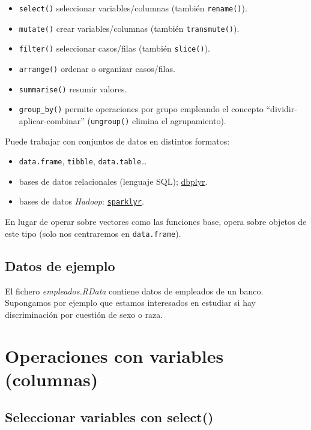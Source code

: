 \documentclass[
]{book}
\theoremstyle{break}
\theoremstyle{nonumberplain}
\begin{document}
\begin{itemize}
\item
  \texttt{select()} seleccionar variables/columnas (también \texttt{rename()}).
\item
  \texttt{mutate()} crear variables/columnas (también \texttt{transmute()}).
\item
  \texttt{filter()} seleccionar casos/filas (también \texttt{slice()}).
\item
  \texttt{arrange()} ordenar o organizar casos/filas.
\item
  \texttt{summarise()} resumir valores.
\item
  \texttt{group\_by()} permite operaciones por grupo empleando el concepto
  ``dividir-aplicar-combinar'' (\texttt{ungroup()} elimina el agrupamiento).
\end{itemize}

Puede trabajar con conjuntos de datos en distintos formatos:

\begin{itemize}
\item
  \texttt{data.frame}, \texttt{tibble}, \texttt{data.table}\ldots{}
\item
  bases de datos relacionales (lenguaje SQL); \href{https://dbplyr.tidyverse.org}{dbplyr}.
\item
  bases de datos \emph{Hadoop}: \href{https://spark.rstudio.com}{\texttt{sparklyr}}.
\end{itemize}

En lugar de operar sobre vectores como las funciones base,
opera sobre objetos de este tipo (solo nos centraremos en \texttt{data.frame}).

\hypertarget{datos-de-ejemplo-1}{%
\subsection{Datos de ejemplo}\label{datos-de-ejemplo-1}}

El fichero \emph{empleados.RData} contiene datos de empleados de un banco.
Supongamos por ejemplo que estamos interesados en estudiar si hay
discriminación por cuestión de sexo o raza.

\hypertarget{dplyr-variables}{%
\section{Operaciones con variables (columnas)}\label{dplyr-variables}}

\hypertarget{seleccionar-variables-con-select}{%
\subsection{\texorpdfstring{Seleccionar variables con \textbf{select()}}{Seleccionar variables con select()}}\label{seleccionar-variables-con-select}}
\end{document}
